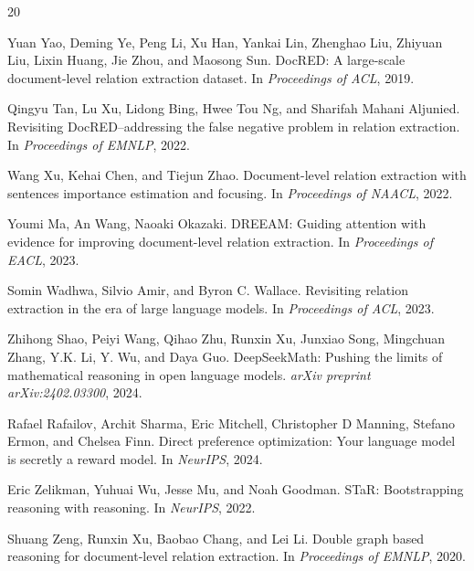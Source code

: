 \documentclass[11pt,a4paper]{article}
\begin{document}
\begin{thebibliography}{20}

Yuan Yao, Deming Ye, Peng Li, Xu Han, Yankai Lin, Zhenghao Liu, Zhiyuan Liu, Lixin Huang, Jie Zhou, and Maosong Sun.
\newblock DocRED: A large-scale document-level relation extraction dataset.
\newblock In \emph{Proceedings of ACL}, 2019.

Qingyu Tan, Lu Xu, Lidong Bing, Hwee Tou Ng, and Sharifah Mahani Aljunied.
\newblock Revisiting DocRED--addressing the false negative problem in relation extraction.
\newblock In \emph{Proceedings of EMNLP}, 2022.

Wang Xu, Kehai Chen, and Tiejun Zhao.
\newblock Document-level relation extraction with sentences importance estimation and focusing.
\newblock In \emph{Proceedings of NAACL}, 2022.

Youmi Ma, An Wang, Naoaki Okazaki.
\newblock DREEAM: Guiding attention with evidence for improving document-level relation extraction.
\newblock In \emph{Proceedings of EACL}, 2023.

Somin Wadhwa, Silvio Amir, and Byron C. Wallace.
\newblock Revisiting relation extraction in the era of large language models.
\newblock In \emph{Proceedings of ACL}, 2023.

Zhihong Shao, Peiyi Wang, Qihao Zhu, Runxin Xu, Junxiao Song, Mingchuan Zhang, Y.K. Li, Y. Wu, and Daya Guo.
\newblock DeepSeekMath: Pushing the limits of mathematical reasoning in open language models.
\newblock \emph{arXiv preprint arXiv:2402.03300}, 2024.

Rafael Rafailov, Archit Sharma, Eric Mitchell, Christopher D Manning, Stefano Ermon, and Chelsea Finn.
\newblock Direct preference optimization: Your language model is secretly a reward model.
\newblock In \emph{NeurIPS}, 2024.

Eric Zelikman, Yuhuai Wu, Jesse Mu, and Noah Goodman.
\newblock STaR: Bootstrapping reasoning with reasoning.
\newblock In \emph{NeurIPS}, 2022.

Shuang Zeng, Runxin Xu, Baobao Chang, and Lei Li.
\newblock Double graph based reasoning for document-level relation extraction.
\newblock In \emph{Proceedings of EMNLP}, 2020.


\end{thebibliography}
\end{document}

